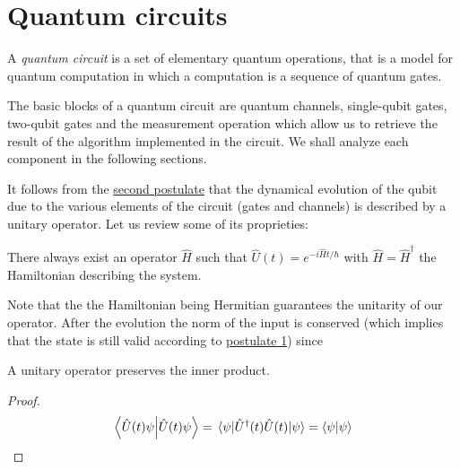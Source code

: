 \section{Quantum circuits}
A \emph{quantum circuit} is a set of elementary quantum operations, that is a model for quantum computation in which a computation is a sequence of quantum gates.

The basic blocks of a quantum circuit are quantum channels, single-qubit gates, two-qubit gates and the measurement operation which allow us to retrieve the result of the algorithm implemented in the circuit. We shall analyze each component in the following sections.

It follows from the \hyperref[postulate:2]{second postulate} that the dynamical evolution of the qubit due to the various elements of the circuit (gates and channels) is described by a unitary operator. Let us review some of its proprieties: 
\begin{theorem}\label{theorem:1}
There always exist an operator $\hat{H}$ such that $\hat{U}(t) = e^{-i\hat{H}t/\hbar}$ with $\hat{H} = \hat{H}^\dagger$ the Hamiltonian describing the system. \cite[p.145]{Shankar}
\end{theorem}

Note that the the Hamiltonian being Hermitian guarantees the unitarity of our operator. After the evolution the norm of the input is conserved (which implies that the state is still valid according to \hyperref[postulate:1]{postulate 1}) since
\begin{theorem}
A unitary operator preserves the inner product.
\end{theorem}
\begin{proof}
\begin{equation*}
    \bra{\hat{U}(t)\psi}\ket{\hat{U}(t)\psi} = \expval{\hat{U}^\dagger(t)\hat{U}(t)}{\psi} = \braket{\psi}
\end{equation*}
\end{proof}


